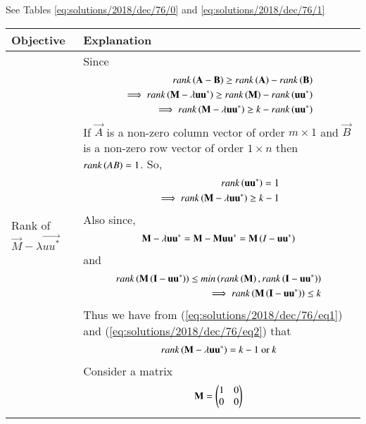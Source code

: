 See Tables \ref{eq:solutions/2018/dec/76/0} and \ref{eq:solutions/2018/dec/76/1}

\begin{table*}[htbp]
        \centering
	\begin{tabular}{|m{2.0in}|m{5.0in}|} \hline
		\textbf{Objective} & \textbf{Explanation} \\ \hline
	Rank of $\vec{M}-\lambda \vec{uu^*}$ & Since 
	\begin{align}
	rank\left(\mathbf{A}-\mathbf{B}\right) \geq rank\left(\mathbf{A}\right)-rank\left(\mathbf{B}\right) \\
		\implies rank\left(\mathbf{M}-\lambda\mathbf{uu^*}\right) \geq 
	rank\left(\mathbf{M}\right)-rank\left(\mathbf{uu^*}\right) \\
		\implies rank\left(\mathbf{M}-\lambda\mathbf{uu^*}\right) \geq k-rank\left(\mathbf{uu^*}\right)
	\end{align} 
If $\vec{A}$ is a non-zero column vector of order $m\times 1$ and $\vec{B}$ is a non-zero row vector 
of order $1\times n$ then $rank\left(AB\right)=1$. So,
	\begin{align}
	rank\left(\mathbf{uu^*}\right)=1 \\
	\implies rank\left(\mathbf{M}-\lambda\mathbf{uu^*}\right) \geq k-1 \label{eq:solutions/2018/dec/76/eq1}
	\end{align}
Also since,
	\begin{align}
	\mathbf{M}-\lambda\mathbf{uu^*} = \mathbf{M}-\mathbf{Muu^*}=\mathbf{M}\left(I-\mathbf{uu^*}\right)
	\end{align}
and
	\begin{align}
	rank\left(\mathbf{M}\left(\mathbf{I}-\mathbf{uu^*}\right)\right)
	\leq min\left(rank\left(\mathbf{M}\right),rank\left(\mathbf{I}-\mathbf{uu^*}\right)\right) \\
	\implies
	rank\left(\mathbf{M}\left(\mathbf{I}-\mathbf{uu^*}\right)\right) \leq k \label{eq:solutions/2018/dec/76/eq2}
	\end{align}
Thus we have from (\ref{eq:solutions/2018/dec/76/eq1}) and (\ref{eq:solutions/2018/dec/76/eq2}) that
	\begin{align}
	rank\left(\mathbf{M}-\lambda\mathbf{uu^*}\right) = k-1 \ \text{or} \ k
	\end{align}
	Consider a matrix 
	\begin{align}
		\mathbf{M}=\begin{pmatrix}1&0\\0&0\end{pmatrix}
	\end{align}
\end{tabular}
\caption{}
\label{eq:solutions/2018/dec/76/0}
\end{table*}

